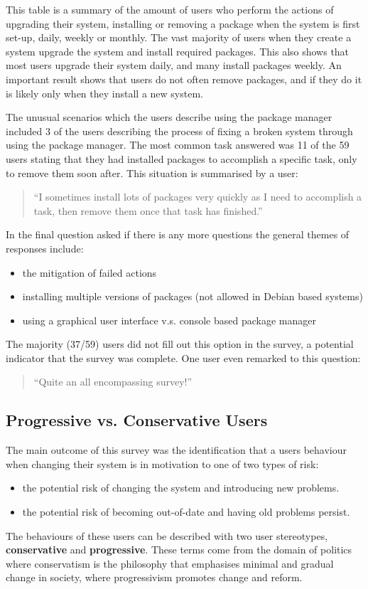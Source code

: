 This table is a summary of the amount of users who perform the actions of upgrading their system, installing or removing a package 
when the system is first set-up, daily, weekly or monthly.
The vast majority of users when they create a system upgrade the system and install required packages.
This also shows that most users upgrade their system daily, and many install packages weekly.
An important result shows that users do not often remove packages, and if they do it is likely only when they install a new system.

The unusual scenarios which the users describe using the package manager included
3 of the users describing the process of fixing a broken system through using the package manager. 
The most common task answered was 11 of the 59 users stating that they had installed packages to accomplish a specific task, only to remove them soon after.
This situation is summarised by a user: 
\begin{quote}
``I sometimes install lots of packages very quickly as I need to accomplish a task, then remove them once that task has finished.''
\end{quote}

In the final question asked if there is any more questions the general themes of responses include:
\begin{itemize}
  \item the mitigation of failed actions
  \item installing multiple versions of packages (not allowed in Debian based systems)
  \item using a graphical user interface v.s. console based package manager
\end{itemize} 
The majority (37/59) users did not fill out this option in the survey, a potential indicator that the survey was complete.
One user even remarked to this question:
\begin{quote}
``Quite an all encompassing survey!''
\end{quote}

\subsection{Progressive vs. Conservative Users}
The main outcome of this survey was the identification that a users behaviour when changing their system is in motivation to one of two types of risk:
\begin{itemize}
  \item the potential risk of changing the system and introducing new problems.
  \item the potential risk of becoming out-of-date and having old problems persist.
\end{itemize}
The behaviours of these users can be described with two user stereotypes, \textbf{conservative} and \textbf{progressive}.
These terms come from the domain of politics where conservatism is the philosophy that emphasises minimal and gradual change in society,
where progressivism promotes change and reform.

